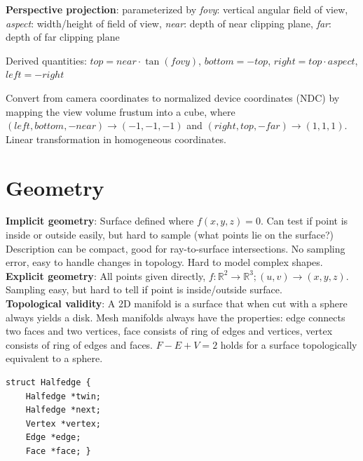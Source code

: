 \documentclass[9pt,landscape]{extarticle}
\begin{document}
\begin{multicols}{3}
\textbf{Perspective projection}: parameterized by \textit{fovy}: vertical angular field of view, \textit{aspect}: width/height of field of view, \textit{near}: depth of near clipping plane, \textit{far}: depth of far clipping plane

Derived quantities: $top = near \cdot \tan(fovy)$, $bottom = -top$, $right = top \cdot aspect$, $left = -right$

Convert from camera coordinates to normalized device coordinates (NDC) by mapping the view volume frustum into a cube, where $(left, bottom, -near) \rightarrow (-1, -1, -1)$ and $(right, top, -far) \rightarrow (1, 1, 1)$. Linear transformation in homogeneous coordinates.



\section{Geometry}

\textbf{Implicit geometry}: Surface defined where $f(x, y, z) = 0$. Can test if point is inside or outside easily, but hard to sample (what points lie on the surface?) Description can be compact, good for ray-to-surface intersections. No sampling error, easy to handle changes in topology. Hard to model complex shapes. \\
\textbf{Explicit geometry}: All points given directly, $f : \mathbb{R}^2 \rightarrow \mathbb{R}^3; (u, v) \rightarrow (x, y, z)$. Sampling easy, but hard to tell if point is inside/outside surface. \\
\textbf{Topological validity}: A 2D manifold is a surface that when cut with a sphere always yields a disk. Mesh manifolds always have the properties: edge connects two faces and two vertices, face consists of ring of edges and vertices, vertex consists of ring of edges and faces. $F - E + V = 2$ holds for a surface topologically equivalent to a sphere.

\begin{multicols}{2}
\begin{verbatim}
struct Halfedge {
    Halfedge *twin;
    Halfedge *next;
    Vertex *vertex;
    Edge *edge;
    Face *face; }
\end{verbatim}


\end{multicols}
\end{multicols}
\end{document}
